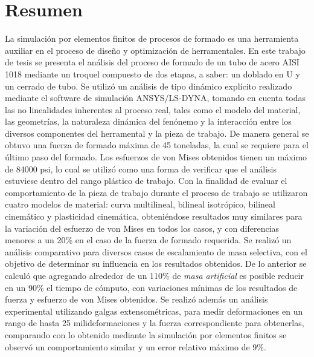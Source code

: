 \chapter*{Resumen}


La simulación por elementos finitos de procesos de formado es una herramienta auxiliar en el proceso de 
diseño y optimización de herramentales. En este trabajo de tesis se presenta el análisis del proceso de formado 
de un tubo de acero AISI 1018 mediante un troquel compuesto de dos etapas, a saber: un doblado en U y un 
cerrado de tubo. Se utilizó un análisis de tipo dinámico explícito realizado mediante el software de simulación 
ANSYS/LS-DYNA\CR, tomando en cuenta todas las no linealidades inherentes al proceso real, tales 
como el modelo del material, las geometrías, la naturaleza dinámica del fenónemo y la interacción 
entre los diversos componentes del herramental y la pieza de trabajo.
De manera general se obtuvo una fuerza de formado máxima de 45 toneladas, la cual se requiere para el último 
paso del formado. Los esfuerzos de von Mises obtenidos tienen un máximo de 84000 psi, lo cual se utilizó 
como una forma de verificar que el análisis estuviese dentro del rango plástico de trabajo.
Con la finalidad de evaluar el comportamiento de la pieza de trabajo durante el proceso de trabajo se 
utilizaron cuatro modelos de material: curva multilineal, bilineal isotrópico, bilineal cinemático y 
plasticidad cinemática, obteniéndose resultados muy similares para la variación del esfuerzo de von Mises 
en todos los casos, y con diferencias menores a un 20\% en el caso de la fuerza de formado requerida. 
Se realizó un análisis comparativo para diversos casos de escalamiento de masa selectiva, con el objetivo 
de determinar su influencia en los resultados obtenidos. De lo anterior se calculó que agregando alrededor de 
un 110\% de \textit{masa artificial} es posible reducir en un 90\% el tiempo de cómputo, con variaciones mínimas 
de los resultados de fuerza y esfuerzo de von Mises obtenidos. Se realizó además un análisis experimental utilizando 
galgas extensométricas, para medir deformaciones en un rango de hasta 25 milideformaciones y la fuerza correspondiente 
para obtenerlas, comparando con lo obtenido mediante la simulación por elementos finitos se observó un 
comportamiento similar y un error relativo máximo de 9\%.
